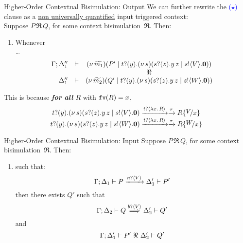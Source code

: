 \documentclass{beamer}
\begin{document}
	\begin{frame}{Higher-Order Contextual Bisimulation: Output}
		We can further rewrite the \textcolor{blue}{($\star$)} clause as a \underline{non universally quantified} input triggered context:
		\\[2mm]

		Suppose $P \,\Re\, Q$, for some context bisimulation~$\Re$. Then:
		\begin{enumerate}[$(\star)$]
			\item	Whenever\\
				\dots
				\[
					\begin{array}{rcc}
						\Gamma; \Delta_1'' &\vdash& (\nu\, \widetilde{m_1})(P' \;|\; t ? (y) .(\nu\, s)(s ? (z) . y\, {z} \;|\; s ! \langle V \rangle . \mathbf{0}))
						\\
						&& \Re
						\\
						\Delta_1'' &\vdash& (\nu\, \widetilde{m_2})(Q' \;|\; t ? (y) .(\nu\, s)(s ? (z) . y\, {z} \;|\; s ! \langle W \rangle . \mathbf{0}))
					\end{array}
				\]
		\end{enumerate}

		This is because \emph{\textbf{for all} $R$} with $\mathtt{fv}(R)=x$, 
		\[
			\begin{array}{c}
			\binp{t}{y}\newsp{s}{\binp{s}{z} \appl{y}{z} \Par \bout{s}{V} \inact}
			\by{\bactinp{t}{\abs{x}{R}}} \by{\tau}
			R \subst{V}{x}
			\\
			\binp{t}{y}\newsp{s}{\binp{s}{z} \appl{y}{z} \Par \bout{s}{W} \inact}
			\by{\bactinp{t}{\abs{x}{R}}} \by{\tau}
			R \subst{W}{x}
			\end{array}
		\]
	\end{frame}

	\begin{frame}{Higher-Order Contextual Bisimulation: Input}
		Suppose $P \,\Re\, Q$, for some context bisimulation~$\Re$. Then:
		\begin{enumerate}[$(\bullet)$]
			\item	{} such that:
				\[
					\Gamma; \Delta_1 \vdash P \xrightarrow{n ? \langle V \rangle} \Delta_1' \vdash P'
				\]
				then there exists $Q'$ such that
				\[
					\Gamma; \Delta_2 \vdash Q \stackrel{b ? \langle V \rangle}{\Longrightarrow} \Delta_2' \vdash Q'
				\]
				and
				\[
					\Gamma; \Delta_1' \vdash P'\ \Re\ \Delta_2' \vdash Q'
				\]
		\end{enumerate}
	\end{frame}
\end{document}
